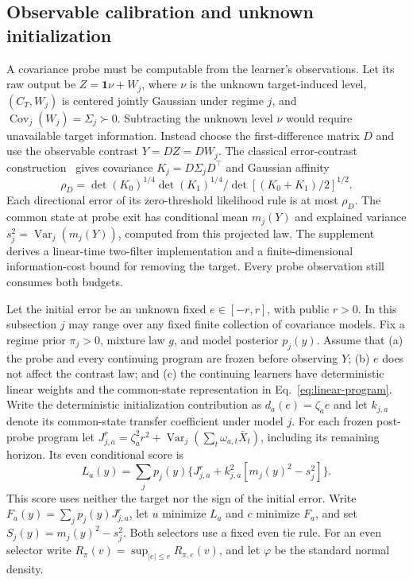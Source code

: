 \subsection{Observable calibration and unknown initialization}
A covariance probe must be computable from the learner's observations.
Let its raw output be $Z=\boldsymbol1\nu+W_j$, where $\nu$ is the unknown target-induced level, $(C_T,W_j)$ is centered jointly Gaussian under regime $j$, and $\operatorname{Cov}_j(W_j)=\Sigma_j\succ0$.
Subtracting the unknown level $\nu$ would require unavailable target information.
Instead choose the first-difference matrix $D$ and use the observable contrast $Y=DZ=DW_j$.
The classical error-contrast construction~\cite{harville1974contrasts} gives covariance $K_j=D\Sigma_jD^\top$ and Gaussian affinity
\[
\rho_D=\det(K_0)^{1/4}\det(K_1)^{1/4}/\det[(K_0+K_1)/2]^{1/2}.
\]
Each directional error of its zero-threshold likelihood rule is at most $\rho_D$.
The common state at probe exit has conditional mean $m_j(Y)$ and explained variance $s_j^2=\operatorname{Var}_j(m_j(Y))$, computed from this projected law.
The supplement derives a linear-time two-filter implementation and a finite-dimensional information-cost bound for removing the target.
Every probe observation still consumes both budgets.

Let the initial error be an unknown fixed $e\in[-r,r]$, with public $r>0$.
In this subsection $j$ may range over any fixed finite collection of covariance models.
Fix a regime prior $\pi_j>0$, mixture law $g$, and model posterior $p_j(y)$.
Assume that (a) the probe and every continuing program are frozen before observing $Y$; (b) $e$ does not affect the contrast law; and (c) the continuing learners have deterministic linear weights and the common-state representation in Eq.~\eqref{eq:linear-program}.
Write the deterministic initialization contribution as $d_a(e)=\zeta_a e$ and let $k_{j,a}$ denote its common-state transfer coefficient under model $j$.
For each frozen post-probe program let $J_{j,a}^{r}=\zeta_a^2r^2+\operatorname{Var}_j(\sum_t\omega_{a,t}\bar X_t)$, including its remaining horizon.
Its even conditional score is
\begin{equation}
L_a(y)=\sum_jp_j(y)\{J_{j,a}^{r}+k_{j,a}^2[m_j(y)^2-s_j^2]\}.
\label{eq:conditional-even-score}
\end{equation}
This score uses neither the target nor the sign of the initial error.
Write $F_a(y)=\sum_jp_j(y)J_{j,a}^{r}$, let $u$ minimize $L_a$ and $c$ minimize $F_a$, and set $S_j(y)=m_j(y)^2-s_j^2$.
Both selectors use a fixed even tie rule.
For an even selector write $R_\pi(v)=\sup_{|e|\le r}R_{\pi,e}(v)$, and let $\varphi$ be the standard normal density.

